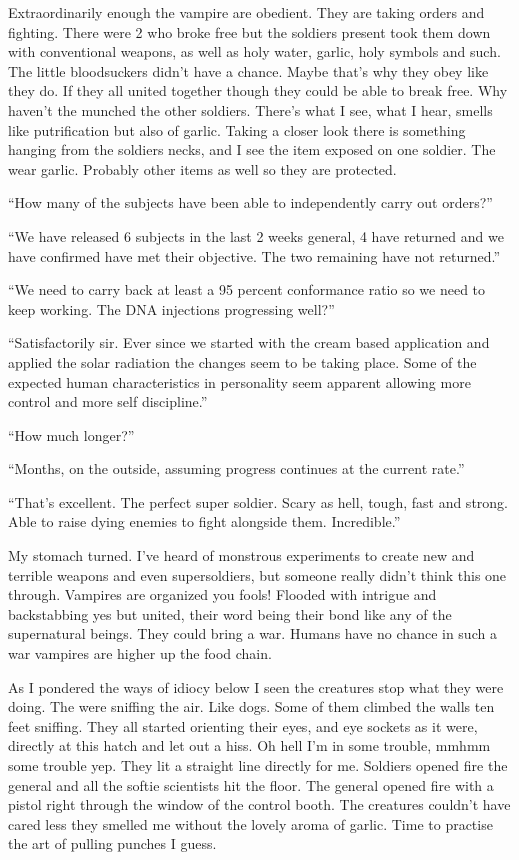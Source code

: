 Extraordinarily enough the vampire are obedient. They are taking orders and fighting. There were 2 who broke free but the soldiers present took them down with conventional weapons, as well as holy water, garlic, holy symbols and such. The little bloodsuckers didn't have a chance. Maybe that's why they obey like they do. If they all united together though they could be able to break free. Why haven't the munched the other soldiers. There's what I see, what I hear, smells like putrification but also of garlic. Taking a closer look there is something hanging from the soldiers necks, and I see the item exposed on one soldier. The wear garlic. Probably other items as well so they are protected.


``How many of the subjects have been able to independently carry out orders?''

``We have released 6 subjects in the last 2 weeks general, 4 have returned and we have confirmed have met their objective. The two remaining have not returned.''

``We need to carry back at least a 95 percent conformance ratio so we need to keep working. The DNA injections progressing well?''

``Satisfactorily sir. Ever since we started with the cream based application and applied the solar radiation the changes seem to be taking place. Some of the expected human characteristics in personality seem apparent allowing more control and more self discipline.''

``How much longer?''

``Months, on the outside, assuming progress continues at the current rate.''

``That's excellent. The perfect super soldier. Scary as hell, tough, fast and strong. Able to raise dying enemies to fight alongside them. Incredible.''

My stomach turned. I've heard of monstrous experiments to create new and terrible weapons and even supersoldiers, but someone really didn't think this one through. Vampires are organized you fools! Flooded with intrigue and backstabbing yes but united, their word being their bond like any of the supernatural beings. They could bring a war. Humans have no chance in such a war vampires are higher up the food chain.

As I pondered the ways of idiocy below I seen the creatures stop what they were doing. The were sniffing the air. Like dogs. Some of them climbed the walls ten feet sniffing. They all started orienting their eyes, and eye sockets as it were, directly at this hatch and let out a hiss. Oh hell I'm in some trouble, mmhmm some trouble yep. They lit a straight line directly for me. Soldiers opened fire the general and all the softie scientists hit the floor. The general opened fire with a pistol right through the window of the control booth. The creatures couldn't have cared less they smelled me without the lovely aroma of garlic. Time to practise the art of pulling punches I guess.

